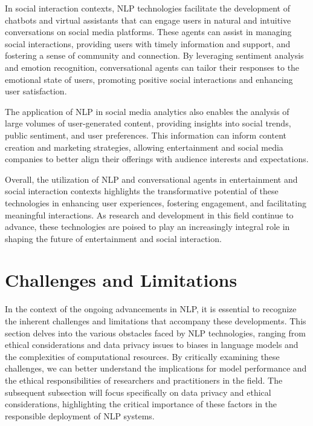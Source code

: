 In social interaction contexts, NLP technologies facilitate the development of chatbots and virtual assistants that can engage users in natural and intuitive conversations on social media platforms. These agents can assist in managing social interactions, providing users with timely information and support, and fostering a sense of community and connection. By leveraging sentiment analysis and emotion recognition, conversational agents can tailor their responses to the emotional state of users, promoting positive social interactions and enhancing user satisfaction.



The application of NLP in social media analytics also enables the analysis of large volumes of user-generated content, providing insights into social trends, public sentiment, and user preferences. This information can inform content creation and marketing strategies, allowing entertainment and social media companies to better align their offerings with audience interests and expectations.



Overall, the utilization of NLP and conversational agents in entertainment and social interaction contexts highlights the transformative potential of these technologies in enhancing user experiences, fostering engagement, and facilitating meaningful interactions. As research and development in this field continue to advance, these technologies are poised to play an increasingly integral role in shaping the future of entertainment and social interaction.












\section{Challenges and Limitations} \label{sec:Challenges and Limitations}

In the context of the ongoing advancements in NLP, it is essential to recognize the inherent challenges and limitations that accompany these developments. This section delves into the various obstacles faced by NLP technologies, ranging from ethical considerations and data privacy issues to biases in language models and the complexities of computational resources. By critically examining these challenges, we can better understand the implications for model performance and the ethical responsibilities of researchers and practitioners in the field. The subsequent subsection will focus specifically on data privacy and ethical considerations, highlighting the critical importance of these factors in the responsible deployment of NLP systems.






